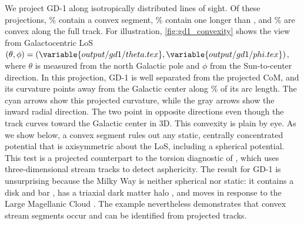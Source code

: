 \documentclass[linenumbers,twocolumn]{aastex701}
\begin{document}
        We project GD-1 along  isotropically distributed lines of sight. %
        Of these projections, \% contain a convex segment, \% contain one longer than , and \% are convex along the full track. %
        For illustration, \autoref{fig:gd1_convexity} shows the view from Galactocentric \gls{LoS} $(\theta,\phi)=(\variable{output/gd1/theta.tex},\variable{output/gd1/phi.tex})$, where $\theta$ is measured from the north Galactic pole and $\phi$ from the Sun-to-center direction. %
        In this projection, GD-1 is well separated from the projected \gls{CoM}, and its curvature points away from the Galactic center along \% of its arc length. %
        The cyan arrows show this projected curvature, while the gray arrows show the inward radial direction. %
        The two point in opposite directions even though the track curves toward the Galactic center in 3D. %
        This convexity is plain by eye. %
        As we show below, a convex segment rules out any static, centrally concentrated potential that is axisymmetric about the \gls{LoS}, including a spherical potential. %
        This test is a projected counterpart to the torsion diagnostic of \citet{Bariego-Quintana:2024:TorsionStellarStreams}, which uses three-dimensional stream tracks to detect asphericity. %
        The result for GD-1 is unsurprising because the Milky Way is neither spherical nor static: it contains a disk and bar \citep{BlandHawthorn+Gerhard:2016:GalaxyContextStructural}, has a triaxial dark matter halo \citep{Law+Majewski:2010:SagittariusDwarfGalaxy,VeraCiro+Helmi:2013:ConstraintsShapeMilky,Han+:2022:StellarHaloGalaxy}, and moves in response to the Large Magellanic Cloud \citep{GaravitoCamargo+:2021:QuantifyingImpactLMC}. %
        The example nevertheless demonstrates that convex stream segments occur and can be identified from projected tracks. %

\end{document}
